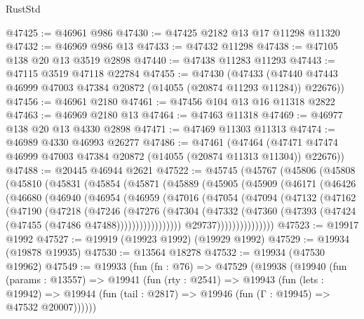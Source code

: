 \begin{lexlean}{RustStd}
\begin{coremodule}
@47425 := @46961 @986
@47430 := @47425 @2182 @13 @17 @11298 @11320
@47432 := @46969 @986 @13
@47433 := @47432 @11298
@47438 := @47105 @138 @20 @13 @3519 @2898
@47440 := @47438 @11283 @11293
@47443 := @47115 @3519 @47118 @22784
@47455 := @47430
    (@47433 (@47440 @47443 @46999 @47003 @47384 @20872 (@14055 (@20874 @11293 @11284)) @22676))
@47456 := @46961 @2180
@47461 := @47456 @104 @13 @16 @11318 @2822
@47463 := @46969 @2180 @13
@47464 := @47463 @11318
@47469 := @46977 @138 @20 @13 @4330 @2898
@47471 := @47469 @11303 @11313
@47474 := @46989 @4330 @46993 @26277
@47486 := @47461
    (@47464 (@47471 @47474 @46999 @47003 @47384 @20872 (@14055 (@20874 @11313 @11304)) @22676))
@47488 := @20445 @46944 @2621
@47522 := @45745
    (@45767
      (@45806
        (@45808
          (@45810
            (@45831
              (@45854
                (@45871
                  (@45889
                    (@45905
                      (@45909
                        (@46171
                          (@46426
                            (@46680
                              (@46940
                                (@46954
                                  (@46959
                                    (@47016
                                      (@47054
                                        (@47094
                                          (@47132
                                            (@47162
                                              (@47190
                                                (@47218
                                                  (@47246
                                                    (@47276
                                                      (@47304
                                                        (@47332
                                                          (@47360
                                                            (@47393
                                                              (@47424
                                                                (@47455
                                                                  (@47486 @47488)))))))))))))))))
                                  @29737)))))))))))))))
@47523 := @19917 @1992
@47527 := @19919 (@19923 @1992) (@19929 @1992)
@47529 := @19934 (@19878 @19935)
@47530 := @13564 @18278
@47532 := @19934 (@47530 @19962)
@47549 := @19933
    (fun (fn : @76) =>
    @47529
      (@19938
        (@19940
          (fun (params : @13557) =>
          @19941
            (fun (rty : @2541) =>
            @19943
              (fun (lets : @19942) =>
              @19944 (fun (tail : @2817) => @19946 (fun (Γ : @19945) => @47532 @20007))))))

\end{coremodule}
\end{lexlean}
